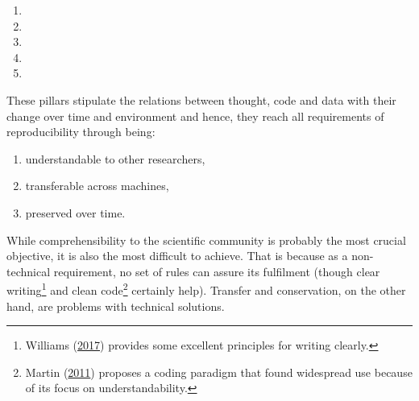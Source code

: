 \documentclass[12pt,a4paper,twoside]{article}
\providecommand{\tightlist}{%
  \setlength{\itemsep}{0pt}\setlength{\parskip}{0pt}}
\begin{document}
\begin{enumerate}
\def\labelenumi{\arabic{enumi}.}
\item
\item
\item
\item
\item
\end{enumerate}

These pillars stipulate the relations between thought, code and data with their change over time and environment and hence, they reach all requirements of reproducibility through being:

\begin{enumerate}
\def\labelenumi{\arabic{enumi}.}
\tightlist
\item
  understandable to other researchers,
\item
  transferable across machines,
\item
  preserved over time.
\end{enumerate}

While comprehensibility to the scientific community is probably the most crucial objective, it is also the most difficult to achieve.
That is because as a non-technical requirement, no set of rules can assure its fulfilment (though clear writing\footnote{Williams (\protect\hyperlink{ref-williamsStyleLessonsClarity2017}{2017}) provides some excellent principles for writing clearly.} and clean code\footnote{Martin (\protect\hyperlink{ref-martinCleanCoderCode2011}{2011}) proposes a coding paradigm that found widespread use because of its focus on understandability.} certainly help).
Transfer and conservation, on the other hand, are problems with technical solutions.
\end{document}
